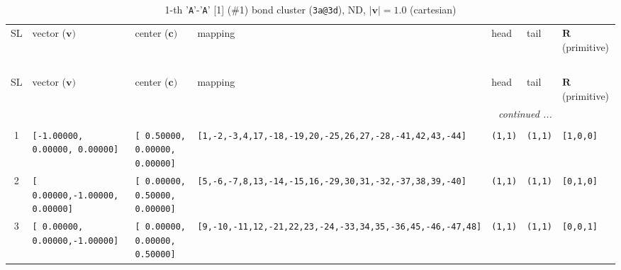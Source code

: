\documentclass[fleqn,10pt,landscape]{jsarticle}
\begin{document}
\renewcommand{\arraystretch}{1.6}
\begin{longtable}[l]{cllllll}
\captionsetup{justification=raggedright, singlelinecheck=off}
\caption{1-th '\texttt{A}'-'\texttt{A}' [1] (\#1) bond cluster (\texttt{3a@3d}), ND, $|\bm{v}|=1.0$ (cartesian)}
 \\
 \hline \hline
SL & vector ($\bm{v})$ & center ($\bm{c})$ & mapping & head & tail & $\bm{R}$ (primitive) \\ \hline \endfirsthead

\multicolumn{6}{l}{\tablename\ \thetable{}} \\
 \hline \hline
SL & vector ($\bm{v})$ & center ($\bm{c})$ & mapping & head & tail & $\bm{R}$ (primitive) \\ \hline \endhead

 \hline \hline
\multicolumn{6}{r}{\footnotesize\it continued ...} \\ \endfoot

 \hline \hline
\multicolumn{6}{r}{} \\ \endlastfoot

1 & \texttt{[-1.00000, 0.00000, 0.00000]} & \texttt{[ 0.50000, 0.00000, 0.00000]} & \texttt{[1,-2,-3,4,17,-18,-19,20,-25,26,27,-28,-41,42,43,-44]} & \texttt{(1,1)} & \texttt{(1,1)} & \texttt{[1,0,0]} \\ \hline
2 & \texttt{[ 0.00000,-1.00000, 0.00000]} & \texttt{[ 0.00000, 0.50000, 0.00000]} & \texttt{[5,-6,-7,8,13,-14,-15,16,-29,30,31,-32,-37,38,39,-40]} & \texttt{(1,1)} & \texttt{(1,1)} & \texttt{[0,1,0]} \\ \hline
3 & \texttt{[ 0.00000, 0.00000,-1.00000]} & \texttt{[ 0.00000, 0.00000, 0.50000]} & \texttt{[9,-10,-11,12,-21,22,23,-24,-33,34,35,-36,45,-46,-47,48]} & \texttt{(1,1)} & \texttt{(1,1)} & \texttt{[0,0,1]} \\
\end{longtable}
\renewcommand{\arraystretch}{1.6}
\end{document}
